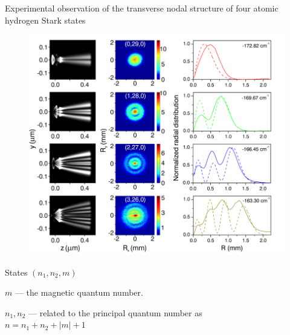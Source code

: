 Experimental observation of the transverse nodal structure of four atomic hydrogen Stark states
\begin{minipage}{0.55\textwidth}
    \begin{figure}[h]
        \centering
        \includegraphics[height=0.8\textwidth]{figures/3.png}
    \end{figure}
\end{minipage}
\hfill
\begin{minipage}{0.35\textwidth}
         States $(n_1,n_2,m)$ 

        \cmark $m$ --- the magnetic quantum number. 

        \cmark $n_1, n_2$ --- related to the principal quantum number as\\
        $
            n = n_1 + n_2 + |m| + 1
        $
\end{minipage}


